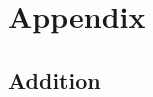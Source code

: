 \chapter{Appendix}
\pagestyle{scrheadings}	
\setcounter{page}{0}
\label{chp_appendix}
\section{Addition}
\begin{figure}[H]

\end{figure}